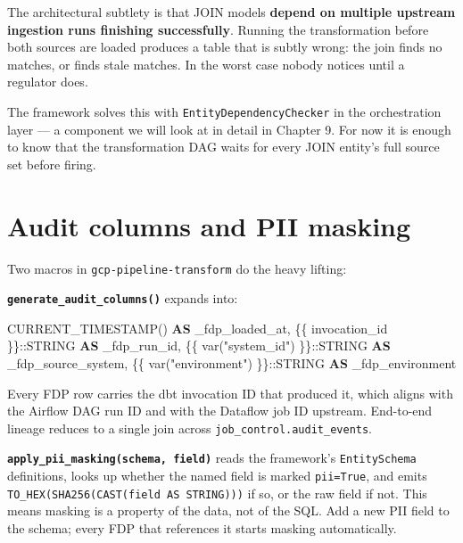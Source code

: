 \documentclass[
  11pt,
  british,
  oneside]{book}
\newenvironment{Shaded}{\begin{snugshade}}{\end{snugshade}}
\newcommand{\CharTok}[1]{\textcolor[rgb]{0.31,0.60,0.02}{#1}}
\newcommand{\FunctionTok}[1]{\textcolor[rgb]{0.00,0.00,0.00}{#1}}
\newcommand{\KeywordTok}[1]{\textcolor[rgb]{0.13,0.29,0.53}{\textbf{#1}}}
\newcommand{\NormalTok}[1]{#1}
\newcommand{\StringTok}[1]{\textcolor[rgb]{0.31,0.60,0.02}{#1}}
\begin{document}
The architectural subtlety is that JOIN models \textbf{depend on
multiple upstream ingestion runs finishing successfully}. Running the
transformation before both sources are loaded produces a table that is
subtly wrong: the join finds no matches, or finds stale matches. In the
worst case nobody notices until a regulator does.

The framework solves this with \texttt{EntityDependencyChecker} in the
orchestration layer --- a component we will look at in detail in Chapter
9. For now it is enough to know that the transformation DAG waits for
every JOIN entity's full source set before firing.

\hypertarget{audit-columns-and-pii-masking}{%
\section{Audit columns and PII
masking}\label{audit-columns-and-pii-masking}}

Two macros in \texttt{gcp-pipeline-transform} do the heavy lifting:

\textbf{\texttt{generate\_audit\_columns()}} expands into:

\begin{Shaded}
\begin{Highlighting}[]
\FunctionTok{CURRENT\_TIMESTAMP}\NormalTok{() }\KeywordTok{AS}\NormalTok{ \_fdp\_loaded\_at,}
\StringTok{\textquotesingle{}\{\{ invocation\_id \}\}\textquotesingle{}}\NormalTok{:}\CharTok{:STRING} \KeywordTok{AS}\NormalTok{ \_fdp\_run\_id,}
\StringTok{\textquotesingle{}\{\{ var("system\_id") \}\}\textquotesingle{}}\NormalTok{:}\CharTok{:STRING} \KeywordTok{AS}\NormalTok{ \_fdp\_source\_system,}
\StringTok{\textquotesingle{}\{\{ var("environment") \}\}\textquotesingle{}}\NormalTok{:}\CharTok{:STRING} \KeywordTok{AS}\NormalTok{ \_fdp\_environment}
\end{Highlighting}
\end{Shaded}

Every FDP row carries the dbt invocation ID that produced it, which
aligns with the Airflow DAG run ID and with the Dataflow job ID
upstream. End-to-end lineage reduces to a single join across
\texttt{job\_control.audit\_events}.

\textbf{\texttt{apply\_pii\_masking(schema,\ field)}} reads the
framework's \texttt{EntitySchema} definitions, looks up whether the
named field is marked \texttt{pii=True}, and emits
\texttt{TO\_HEX(SHA256(CAST(field\ AS\ STRING)))} if so, or the raw
field if not. This means masking is a property of the data, not of the
SQL. Add a new PII field to the schema; every FDP that references it
starts masking automatically.
\end{document}
